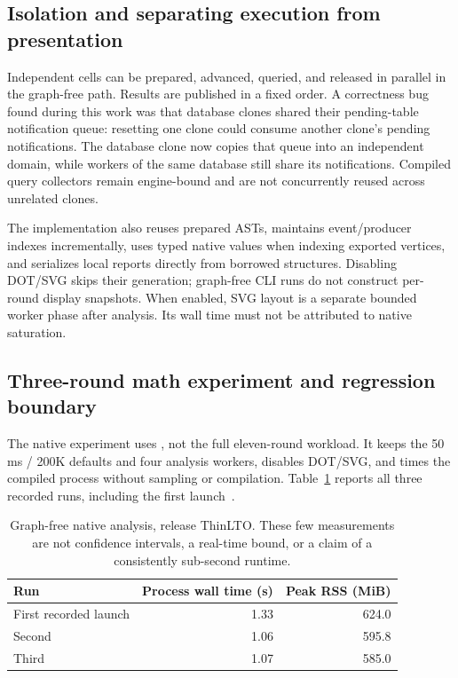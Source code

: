 \documentclass[11pt,a4paper]{article}
\begin{document}
\subsection{Isolation and separating execution from presentation}
Independent cells can be prepared, advanced, queried, and released in parallel
in the graph-free path. Results are published in a fixed order. A correctness
bug found during this work was that database clones shared their pending-table
notification queue: resetting one clone could consume another clone's pending
notifications. The database clone now copies that queue into an independent
domain, while workers of the same database still share its notifications.
Compiled query collectors remain engine-bound and are not concurrently reused
across unrelated clones.

The implementation also reuses prepared ASTs, maintains event/producer indexes
incrementally, uses typed native values when indexing exported vertices, and
serializes local reports directly from borrowed structures. Disabling DOT/SVG
skips their generation; graph-free CLI runs do not construct per-round display
snapshots. When enabled, SVG layout is a separate bounded worker phase after
analysis. Its wall time must not be attributed to native saturation.

\subsection{Three-round math experiment and regression boundary}
The native experiment uses
, not the full eleven-round workload.
It keeps the 50 ms / 200K defaults and four analysis workers, disables DOT/SVG,
and times the compiled process without sampling or compilation. Table~\ref{tab:mini3-current}
reports all three recorded runs, including the first launch~\cite{runtime}.
\begin{table}[!htbp]\centering\small
\begin{tabular}{@{}lrr@{}}\toprule
Run & Process wall time (s) & Peak RSS (MiB)\\\midrule
First recorded launch & 1.33 & 624.0\\
Second & 1.06 & 595.8\\
Third & 1.07 & 585.0\\\bottomrule
\end{tabular}
\caption{Graph-free native analysis, release ThinLTO. These few measurements
are not confidence intervals, a real-time bound, or a claim of a consistently
sub-second runtime.}
\label{tab:mini3-current}
\end{table}
\end{document}
